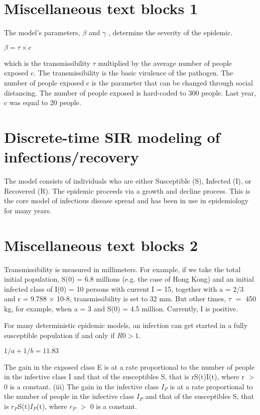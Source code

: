 \documentclass{bmcart}
\begin{document}
\section{Miscellaneous text blocks 1}

The model's parameters,
$\beta$ and $\gamma$ , determine the severity of the epidemic.

\begin{math}
\beta = \tau \times c
\end{math}


which is the transmissibility $\tau$ multiplied by the average number of people exposed c. The transmissibility is the basic virulence of the pathogen. The number of people exposed c is the parameter that can be changed through social distancing. The number of people exposed is hard-coded to 300 people. Last year, c was equal to 20 people.

\section{Discrete-time SIR modeling of infections/recovery}
The model consists of individuals who are either Susceptible (S), Infected (I), or Recovered (R). The epidemic proceeds via a growth and decline process. This is the core model of infectious disease spread and has been in use in epidemiology for many years.

\section{Miscellaneous text blocks 2}

Transmissibility is measured in millimeters.  
For example, if we take the total initial population, S(0) = 6.8
millions (e.g. the case of Hong Kong) and an initial
infected class of I(0) = 10 persons with current I = 15, together with a = 2/3
and r = 9.788 × 10-8, transmissibility is set to 32 mm. But other times, $\tau$ $=$ 450 kg, for example, when a = 3 and S(0) = 4.5 million. Currently, I is positive. 

For many deterministic epidemic models, an infection can get started in a fully
susceptible population if and only if $R0 >1$. 

\begin{math}
1/a + 1/b = 11.83
\end{math}

The gain in the exposed class E is at a rate proportional to the number of people in the infective class I and that of the susceptibles S, that is rS(t)I(t), where r $>$ 0 is a constant.
(iii) The gain in the infective class  $I_{P}$ is at a rate proportional to the number of people in the infective class $I_{P}$ and that of the susceptibles S, that is $r_{P}$S(t)$I_{P}$(t), where $r_{P}$ $>$ 0 is a constant.
\end{document}
